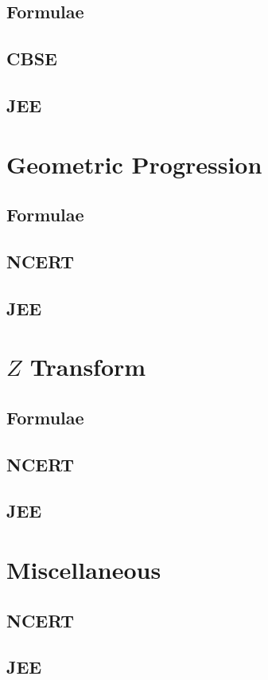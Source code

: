 \documentclass[journal]{IEEEtran}
\begin{document}
\subsection{Formulae}

\subsection{CBSE}

\subsection{JEE}

\section{Geometric Progression}
\subsection{Formulae}

\subsection{NCERT}

\subsection{JEE}

\section{$Z$ Transform}
\subsection{Formulae}

\subsection{NCERT}

\subsection{JEE}

\section{Miscellaneous}
\subsection{NCERT}

\subsection{JEE}

\end{document}
